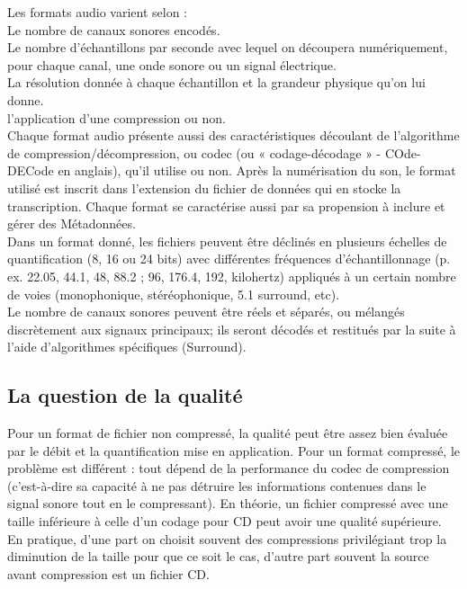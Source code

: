 \documentclass[12pt,a4paper]{report}
\begin{document}
Les formats audio varient selon :\\

    Le nombre de canaux sonores encodés.\\
  Le nombre d'échantillons par seconde avec lequel on découpera numériquement, pour chaque canal, une onde sonore ou un signal électrique.\\
   La résolution donnée à chaque échantillon et la grandeur physique qu'on lui donne.\\
    l'application d'une compression ou non.\\

Chaque format audio présente aussi des caractéristiques découlant de l'algorithme de compression/décompression, ou codec (ou « codage-décodage » - COde-DECode en anglais), qu'il utilise ou non. Après la numérisation du son, le format utilisé est inscrit dans l'extension du fichier de données qui en stocke la transcription. Chaque format se caractérise aussi par sa propension à inclure et gérer des Métadonnées.\\

Dans un format donné, les fichiers peuvent être déclinés en plusieurs échelles de quantification (8, 16 ou 24 bits) avec différentes fréquences d'échantillonnage (p. ex. 22.05, 44.1, 48, 88.2 ; 96, 176.4, 192, kilohertz) appliqués à un certain nombre de voies (monophonique, stéréophonique, 5.1 surround, etc).\\

Le nombre de canaux sonores peuvent être réels et séparés, ou mélangés discrètement aux signaux principaux; ils seront décodés et restitués par la suite à l'aide d'algorithmes spécifiques (Surround).\\


\subsection{La question de la qualité}
Pour un format de fichier non compressé, la qualité peut être assez bien évaluée par le débit et la quantification mise en application. Pour un format compressé, le problème est différent : tout dépend de la performance du codec de compression (c'est-à-dire sa capacité à ne pas détruire les informations contenues dans le signal sonore tout en le compressant). En théorie, un fichier compressé avec une taille inférieure à celle d'un codage pour CD peut avoir une qualité supérieure. En pratique, d'une part on choisit souvent des compressions privilégiant trop la diminution de la taille pour que ce soit le cas, d'autre part souvent la source avant compression est un fichier CD.\\
\end{document}

